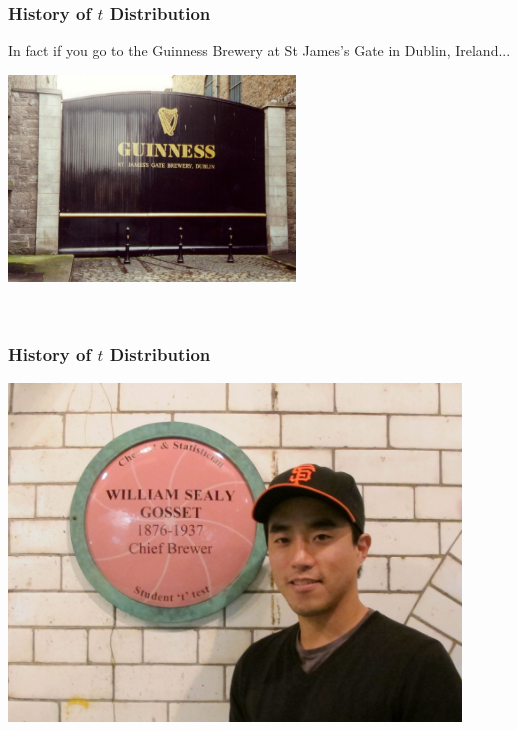 \documentclass[handout]{beamer}
\begin{document}
\begin{frame}
\frametitle{History of $t$ Distribution}
In fact if you go to the Guinness Brewery at St James's Gate in Dublin, Ireland...
\begin{center}
\includegraphics[width=3in]{figure/brewery.jpg}
\end{center}
\
\end{frame}


\begin{frame}
\frametitle{History of $t$ Distribution}
\begin{center}
\includegraphics[width=0.9\textwidth]{figure/guinness.jpg}
\end{center}
\end{frame}
\end{document}

